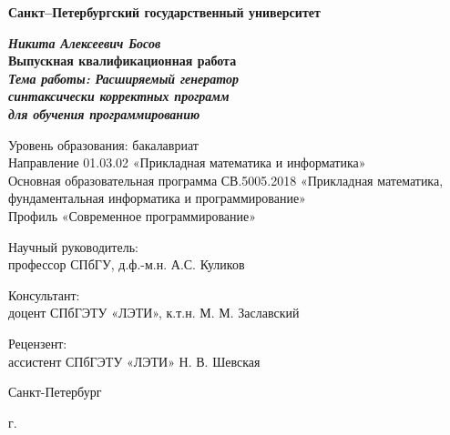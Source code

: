 \begin{titlepage}
    \begin{center}

        \textbf{Санкт--Петербургский государственный университет}


        \vspace{35mm}

        \textbf{\textit{\large Никита Алексеевич Босов}} \\[8mm]
        \textbf{\large Выпускная квалификационная работа}\\[3mm]
        \textbf{\textit{\large Тема работы:  Расширяемый генератор\\синтаксически корректных программ\\для обучения программированию}}

        \vspace{20mm}
        Уровень образования: бакалавриат\\
        Направление 01.03.02 «Прикладная математика и информатика»\\
        Основная образовательная программа СВ.5005.2018
        «Прикладная математика, фундаментальная информатика и программирование»\\
        Профиль «Современное программирование»\\[20mm]


        \begin{flushright}
            \begin{minipage}[t]{0.65\textwidth}
                {Научный руководитель:} \\
                профессор СПбГУ, д.ф.-м.н. А.С. Куликов
                \vspace{5mm}

                {Консультант:} \\
                доцент СПбГЭТУ «ЛЭТИ», к.т.н. М. М. Заславский
                \vspace{5mm}

                {Рецензент:} \\
                ассистент СПбГЭТУ «ЛЭТИ» Н. В. Шевская
            \end{minipage}
        \end{flushright}

        \vfill

        {Санкт-Петербург}
        \par{\the\year{} г.}
    \end{center}
\end{titlepage}
\restoregeometry
\addtocounter{page}{1}
